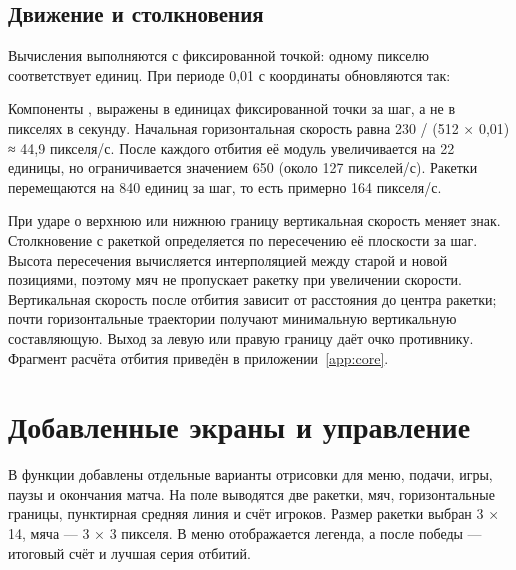\documentclass[a4paper,12pt]{article}
\newcommand{\code}[1]{\texttt{\detokenize{#1}}}
\begin{document}
\subsection{Движение и столкновения}
Вычисления выполняются с фиксированной точкой: одному пикселю соответствует
\code{Q=512} единиц. При периоде 0,01 с координаты обновляются так:
\begin{center}
\code{x += vx; y += vy;}
\end{center}
Компоненты \code{vx}, \code{vy} выражены в единицах фиксированной точки за шаг,
а не в пикселях в секунду. Начальная горизонтальная скорость равна
230 / (512 × 0,01) ≈ 44,9 пикселя/с. После каждого отбития
её модуль увеличивается на 22 единицы, но ограничивается значением 650
(около 127 пикселей/с). Ракетки перемещаются на 840 единиц за шаг,
то есть примерно 164 пикселя/с.

При ударе о верхнюю или нижнюю границу вертикальная скорость меняет знак.
Столкновение с ракеткой определяется по пересечению её плоскости за шаг.
Высота пересечения вычисляется интерполяцией между старой и новой
позициями, поэтому мяч не пропускает ракетку при увеличении скорости.
Вертикальная скорость после отбития зависит от расстояния до центра
ракетки; почти горизонтальные траектории получают минимальную
вертикальную составляющую. Выход за левую или правую границу даёт очко
противнику. Фрагмент расчёта отбития приведён в приложении~\ref{app:core}.

\section{Добавленные экраны и управление}
В функции \code{Pong_Draw()} добавлены отдельные варианты отрисовки
для меню, подачи, игры, паузы и окончания матча. На поле выводятся
две ракетки, мяч, горизонтальные границы, пунктирная средняя линия
и счёт игроков. Размер ракетки выбран 3 × 14, мяча --- 3 × 3
пикселя. В меню отображается легенда, а после победы --- итоговый счёт
и лучшая серия отбитий.
\end{document}
